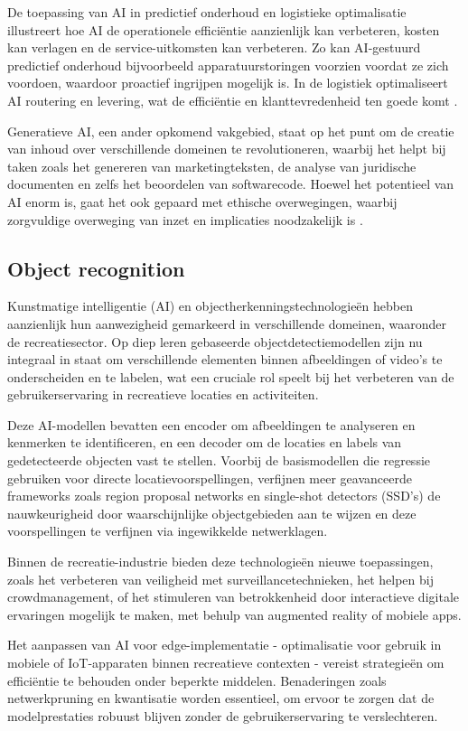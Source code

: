 De toepassing van AI in predictief onderhoud en logistieke optimalisatie illustreert hoe AI de operationele efficiëntie aanzienlijk kan verbeteren, kosten kan verlagen en de service-uitkomsten kan verbeteren. Zo kan AI-gestuurd predictief onderhoud bijvoorbeeld apparatuurstoringen voorzien voordat ze zich voordoen, waardoor proactief ingrijpen mogelijk is. In de logistiek optimaliseert AI routering en levering, wat de efficiëntie en klanttevredenheid ten goede komt \autocite{mckinseyAI}.

Generatieve AI, een ander opkomend vakgebied, staat op het punt om de creatie van inhoud over verschillende domeinen te revolutioneren, waarbij het helpt bij taken zoals het genereren van marketingteksten, de analyse van juridische documenten en zelfs het beoordelen van softwarecode. Hoewel het potentieel van AI enorm is, gaat het ook gepaard met ethische overwegingen, waarbij zorgvuldige overweging van inzet en implicaties noodzakelijk is \autocite{mckinseyAI}.
\subsection{Object recognition}
Kunstmatige intelligentie (AI) en objectherkenningstechnologieën hebben aanzienlijk hun aanwezigheid gemarkeerd in verschillende domeinen, waaronder de recreatiesector. Op diep leren gebaseerde objectdetectiemodellen zijn nu integraal in staat om verschillende elementen binnen afbeeldingen of video's te onderscheiden en te labelen, wat een cruciale rol speelt bij het verbeteren van de gebruikerservaring in recreatieve locaties en activiteiten.

Deze AI-modellen bevatten een encoder om afbeeldingen te analyseren en kenmerken te identificeren, en een decoder om de locaties en labels van gedetecteerde objecten vast te stellen. Voorbij de basismodellen die regressie gebruiken voor directe locatievoorspellingen, verfijnen meer geavanceerde frameworks zoals region proposal networks en single-shot detectors (SSD's) de nauwkeurigheid door waarschijnlijke objectgebieden aan te wijzen en deze voorspellingen te verfijnen via ingewikkelde netwerklagen.

Binnen de recreatie-industrie bieden deze technologieën nieuwe toepassingen, zoals het verbeteren van veiligheid met surveillancetechnieken, het helpen bij crowdmanagement, of het stimuleren van betrokkenheid door interactieve digitale ervaringen mogelijk te maken, met behulp van augmented reality of mobiele apps.

Het aanpassen van AI voor edge-implementatie - optimalisatie voor gebruik in mobiele of IoT-apparaten binnen recreatieve contexten - vereist strategieën om efficiëntie te behouden onder beperkte middelen. Benaderingen zoals netwerkpruning en kwantisatie worden essentieel, om ervoor te zorgen dat de modelprestaties robuust blijven zonder de gebruikerservaring te verslechteren.


